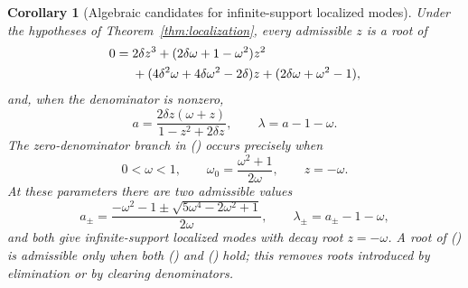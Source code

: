 \documentclass[twoside,10pt]{article}
\numberwithin{equation}{section}
\theoremstyle{slbody}
\newtheorem{corollary}[theorem]{Corollary}
\theoremstyle{definition}
\theoremstyle{remark}
\renewcommand{\eqref}[1]{%
  \textup{{\normalfont(\oldstylenums{\ref{#1}}}\normalfont)}}
\begin{document}
\begin{corollary}[Algebraic candidates for infinite-support localized modes]
\label{cor:localization-algebraic}
Under the hypotheses of Theorem~\ref{thm:localization}, every
admissible $z$ is a root of
\begin{align}
0={}&2\delta z^3+(2\delta\omega+1-\omega^2)z^2\notag\\
&+(4\delta^2\omega+4\delta\omega^2-2\delta)z
 +(2\delta\omega+\omega^2-1),\label{eq:localization-cubic}
\end{align}
and, when the denominator is nonzero,
\begin{equation}\label{eq:localization-recovery}
 a=\frac{2\delta z(\omega+z)}{1-z^2+2\delta z},
 \qquad \lambda=a-1-\omega.
\end{equation}
The zero-denominator branch in \eqref{eq:localization-recovery} occurs
precisely when
\begin{equation}\label{eq:localization-zero-denominator}
 0<\omega<1,\qquad
 \omega_0=\frac{\omega^2+1}{2\omega},\qquad z=-\omega.
\end{equation}
At these parameters there are two admissible values
\begin{equation}\label{eq:localization-zero-denominator-roots}
 a_\pm=\frac{-\omega^2-1
       \pm\sqrt{5\omega^4-2\omega^2+1}}{2\omega},
 \qquad \lambda_\pm=a_\pm-1-\omega,
\end{equation}
and both give infinite-support localized modes with decay root
$z=-\omega$.
A root of \eqref{eq:localization-cubic} is admissible only when both
\eqref{eq:loc-dispersion} and \eqref{eq:loc-match} hold; this removes
roots introduced by elimination or by clearing denominators.
\end{corollary}
\end{document}
